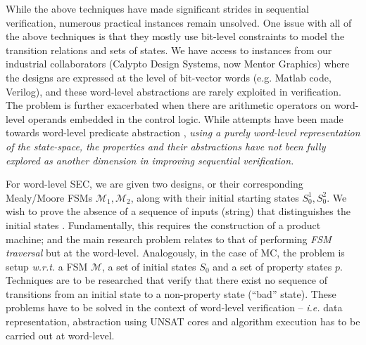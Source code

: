 While the above techniques have made significant strides in sequential
verification, numerous practical instances remain unsolved. One issue
with all of the above techniques is that they mostly use bit-level
constraints to model the transition relations and sets of 
states. We have access to instances from our industrial
collaborators (Calypto Design Systems, now Mentor Graphics) where
the designs are expressed at the level of bit-vector words
(e.g. Matlab code, Verilog), and these word-level abstractions are
rarely exploited in verification. The problem is further exacerbated
when there are arithmetic operators on word-level operands embedded in
the control logic. While attempts have been made towards word-level
predicate abstraction \cite{jain2005word} \cite{mcmillan:cav06}
\cite{mcmillan2010lazy}, {\it using a purely word-level representation
  of the state-space, the properties and their abstractions have not
  been fully explored as another dimension in improving sequential
  verification.}  


For word-level SEC, we are given two designs, or their corresponding
Mealy/Moore FSMs ${\mathcal{M}}_1,{\mathcal{M}}_2$, along with their
initial starting states $S_0^1,S_0^2$. We wish to prove the absence of
a sequence of inputs (string) that distinguishes the initial
states \cite{coudert:iccad90}
\cite{coudert1990verification}. Fundamentally, this requires 
the construction of a product machine; and the main research problem
relates to that of performing {\it FSM traversal} \cite{touati1990implicit}
but  at the word-level. Analogously, in the case of MC, the problem
is setup {\it w.r.t.} a FSM $\mathcal{M}$, a set of initial states $S_0$ and
a set of property states $p$. Techniques are to be researched that
verify that there exist no sequence of transitions from an initial
state to a non-property state (``bad'' state). These problems have to
be solved in the context of word-level verification -- {\it i.e.} data
representation, abstraction using UNSAT cores and
algorithm execution has to be carried out at word-level.   



